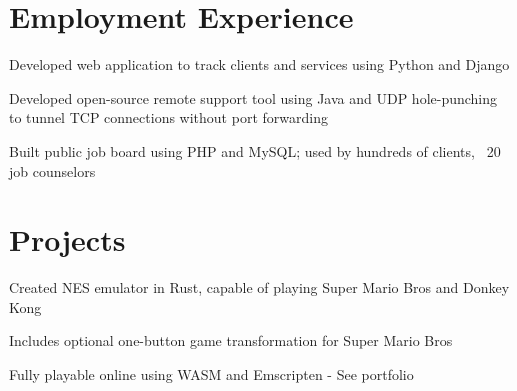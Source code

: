 \documentclass[]{deedy-resume-openfont}
\begin{document}
\hfill
\begin{minipage}[t]{0.67\textwidth} 


\section{Employment Experience}
\vspace{\topsep} %
\begin{tightemize}
	\item 
\end{tightemize}
\sectionsep

\begin{tightemize}
\item Developed web application to track clients and services using Python and Django
\end{tightemize}
\sectionsep

\begin{tightemize}
\item Developed open-source remote support tool using Java and UDP hole-punching to tunnel TCP connections without port forwarding
\item Built public job board using PHP and MySQL; used by hundreds of clients, ~20 job counselors
\end{tightemize}
\sectionsep

\section{Projects}

\begin{tightemize}
	\item Created NES emulator in Rust, capable of playing Super Mario Bros and Donkey Kong
	\item Includes optional one-button game transformation for Super Mario Bros
	\item Fully playable online using WASM and Emscripten - See portfolio
\end{tightemize}
\sectionsep


\end{minipage}
\end{document}
